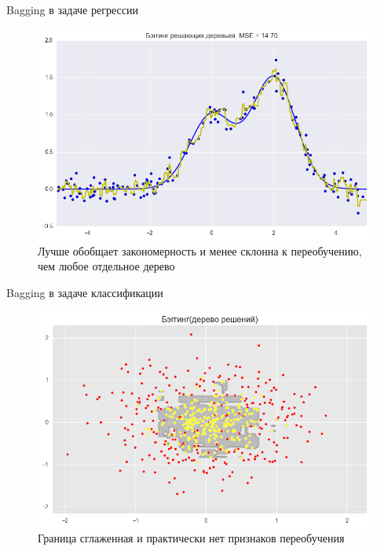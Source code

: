 \documentclass[notheorems, handout]{beamer}
\begin{document}
\begin{frame}{Bagging в задаче регрессии}
  \begin{figure}[h!]
    \includegraphics[width=1 \textwidth]{img/bagging_re}
    \caption{Лучше обобщает закономерность и менее склонна к
    переобучению, чем любое отдельное дерево}
  \end{figure}
\end{frame}

\begin{frame}{Bagging в задаче классификации}
  \begin{figure}[h!]
    \includegraphics[width=1 \textwidth]{img/bagging_cl}
    \caption{Граница сглаженная и практически нет признаков переобучения}
  \end{figure}
\end{frame}
\end{document}
